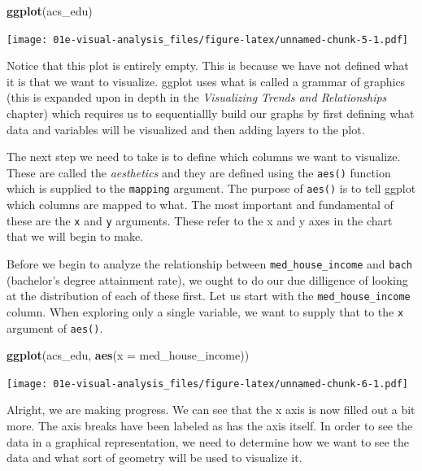 \documentclass[
]{book}
\newenvironment{Shaded}{\begin{snugshade}}{\end{snugshade}}
\newcommand{\DataTypeTok}[1]{\textcolor[rgb]{0.13,0.29,0.53}{#1}}
\newcommand{\KeywordTok}[1]{\textcolor[rgb]{0.13,0.29,0.53}{\textbf{#1}}}
\newcommand{\NormalTok}[1]{#1}
\begin{document}
\begin{Shaded}
\begin{Highlighting}[]
\KeywordTok{ggplot}\NormalTok{(acs\_edu)}
\end{Highlighting}
\end{Shaded}

\texttt{[image: 01e-visual-analysis\_files/figure-latex/unnamed-chunk-5-1.pdf]}

Notice that this plot is entirely empty. This is because we have not defined what it is that we want to visualize. ggplot uses what is called a grammar of graphics (this is expanded upon in depth in the \emph{Visualizing Trends and Relationships} chapter) which requires us to sequentiallly build our graphs by first defining what data and variables will be visualized and then adding layers to the plot.

The next step we need to take is to define which columns we want to visualize. These are called the \emph{aesthetics} and they are defined using the \texttt{aes()} function which is supplied to the \texttt{mapping} argument. The purpose of \texttt{aes()} is to tell ggplot which columns are mapped to what. The most important and fundamental of these are the \texttt{x} and \texttt{y} arguments. These refer to the x and y axes in the chart that we will begin to make.

Before we begin to analyze the relationship between \texttt{med\_house\_income} and \texttt{bach} (bachelor's degree attainment rate), we ought to do our due dilligence of looking at the distribution of each of these first. Let us start with the \texttt{med\_house\_income} column. When exploring only a single variable, we want to supply that to the \texttt{x} argument of \texttt{aes()}.

\begin{Shaded}
\begin{Highlighting}[]
\KeywordTok{ggplot}\NormalTok{(acs\_edu, }\KeywordTok{aes}\NormalTok{(}\DataTypeTok{x =}\NormalTok{ med\_house\_income))}
\end{Highlighting}
\end{Shaded}

\texttt{[image: 01e-visual-analysis\_files/figure-latex/unnamed-chunk-6-1.pdf]}

Alright, we are making progress. We can see that the x axis is now filled out a bit more. The axis breaks have been labeled as has the axis itself. In order to see the data in a graphical representation, we need to determine how we want to see the data and what sort of geometry will be used to visualize it.
\end{document}
